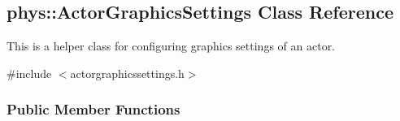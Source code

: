 \hypertarget{classphys_1_1ActorGraphicsSettings}{
\subsection{phys::ActorGraphicsSettings Class Reference}
\label{classphys_1_1ActorGraphicsSettings}
}


This is a helper class for configuring graphics settings of an actor.  




{\ttfamily \#include $<$actorgraphicssettings.h$>$}

\subsubsection*{Public Member Functions}
